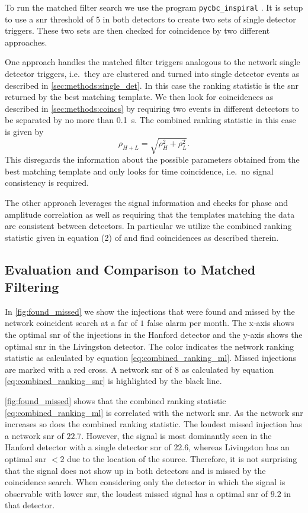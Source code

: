 To run the matched filter search we use the program \verb|pycbc_inspiral| \cite{pycbc_version}. It is setup to use a \acrshort{snr} threshold of $5$ in both detectors to create two sets of single detector triggers. These two sets are then checked for coincidence by two different approaches.

One approach handles the matched filter triggers analogous to the network single detector triggers, i.e.\ they are clustered and turned into single detector events as described in \autoref{sec:methods:single_det}. In this case the ranking statistic is the \acrshort{snr} returned by the best matching template. We then look for coincidences as described in \autoref{sec:methods:coincs} by requiring two events in different detectors to be separated by no more than \SI{0.1}{\second}. The combined ranking statistic in this case is given by
\begin{equation}\label{eq:combined_ranking_snr}
    \rho_{H+L}=\sqrt{\rho_H^2+\rho_L^2}.
\end{equation}
This disregards the information about the possible parameters obtained from the best matching template and only looks for time coincidence, i.e.\ no signal consistency is required.

The other approach leverages the signal information and checks for phase and amplitude correlation as well as requiring that the templates matching the data are consistent between detectors. In particular we utilize the combined ranking statistic given in equation (2) of \cite{Nitz:2017svb} and find coincidences as described therein.

\subsection{Evaluation and Comparison to Matched Filtering}\label{sec:net_sens}
In \autoref{fig:found_missed} we show the injections that were found and missed by the network coincident search at a \acrshort{far} of $1$ false alarm per month. The x-axis shows the optimal \acrshort{snr} of the injections in the Hanford detector and the y-axis shows the optimal \acrshort{snr} in the Livingston detector. The color indicates the network ranking statistic as calculated by equation \eqref{eq:combined_ranking_ml}. Missed injections are marked with a red cross. A network \acrshort{snr} of $8$ as calculated by equation \eqref{eq:combined_ranking_snr} is highlighted by the black line.

\autoref{fig:found_missed} shows that the combined ranking statistic \eqref{eq:combined_ranking_ml} is correlated with the network \acrshort{snr}. As the network \acrshort{snr} increases so does the combined ranking statistic. The loudest missed injection has a network \acrshort{snr} of $22.7$. However, the signal is most dominantly seen in the Hanford detector with a single detector \acrshort{snr} of $22.6$, whereas Livingston has an optimal \acrshort{snr} $<2$ due to the location of the source. Therefore, it is not surprising that the signal does not show up in both detectors and is missed by the coincidence search. When considering only the detector in which the signal is observable with lower \acrshort{snr}, the loudest missed signal has a optimal \acrshort{snr} of $9.2$ in that detector.

